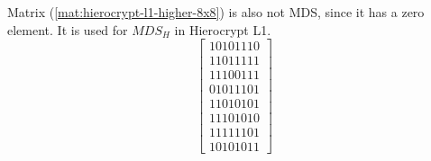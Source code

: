 Matrix (\ref{mat:hierocrypt-l1-higher-8x8}) is also not MDS, since it has a zero element. It is used for $MDS_H$ in Hierocrypt L1.
\begin{equation}\label{mat:hierocrypt-l1-higher-8x8}
\begin{bmatrix}
10101110\\
11011111\\
11100111\\
01011101\\
11010101\\
11101010\\
11111101\\
10101011
\end{bmatrix}
\end{equation}
